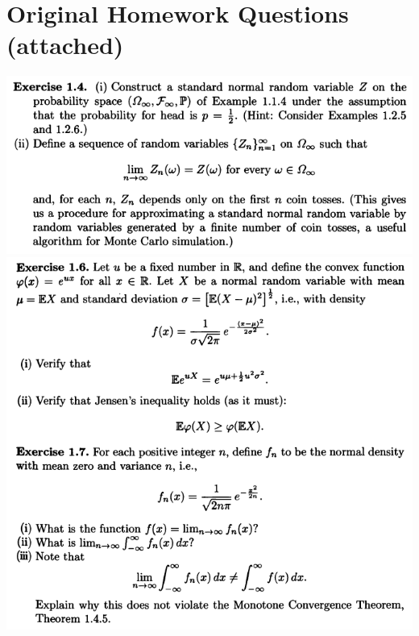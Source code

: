\documentclass[final,3p,authoryear]{elsarticle}
\begin{document}
	
\appendix

\section{Original Homework Questions (attached)}
%	
	\includegraphics[width=14cm]{Exercise1p4.png}\\
	\includegraphics[width=14cm]{Exercise1p61p7.png}


%
%
%
	
	
%
%
%
%
%
%
\end{document}
